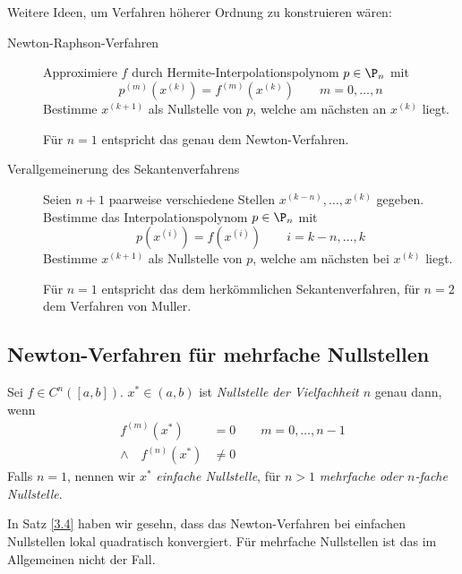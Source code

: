 \documentclass[11pt]{scrartcl}
\begin{document}
Weitere Ideen, um Verfahren höherer Ordnung zu konstruieren wären:
\begin{description}
	\item[Newton-Raphson-Verfahren]
		Approximiere $f$ durch Hermite-Interpolationspolynom $p\in \P_n$ mit 
		\[
			p^{(m)}(x^{(k)}) = f^{(m)}(x^{(k)}) \qquad m=0,\dotsc,n
		\]
		Bestimme $x^{(k+1)}$ als Nullstelle von $p$, welche am nächsten an $x^{(k)}$ liegt.

		Für $n=1$ entspricht das genau dem Newton-Verfahren.
	\item[Verallgemeinerung des Sekantenverfahrens]
		Seien $n+1$ paarweise verschiedene Stellen $x^{(k-n)}, \dotsc, x^{(k)}$ gegeben.
		Bestimme das Interpolationspolynom $p\in \P_n$ mit
		\[
			p(x^{(i)}) = f(x^{(i)}) \qquad i=k-n,\dotsc,k
		\]
		Bestimme $x^{(k+1)}$ als Nullstelle von $p$, welche am nächsten bei $x^{(k)}$ liegt.

		Für $n=1$ entspricht das dem herkömmlichen Sekantenverfahren, für $n=2$ dem Verfahren von Muller.
\end{description}


\subsection{Newton-Verfahren für mehrfache Nullstellen}

\begin{df} \label{3.14}
	Sei $f\in C^n ([a,b])$.
	$x^* \in (a,b)$ ist \emph{Nullstelle der Vielfachheit $n$} genau dann, wenn
	\begin{align*}
		f^{(m)}(x^*) &= 0 \qquad m=0,\dotsc,n-1 \\
		\land\quad f^{(n)}(x^*) &\neq 0
	\end{align*}
	Falls $n=1$, nennen wir $x^*$ \emph{einfache Nullstelle}, für $n>1$ \emph{mehrfache oder $n$-fache Nullstelle}.
\end{df}

\begin{nt*}
	In Satz \ref{3.4} haben wir gesehn, dass das Newton-Verfahren bei einfachen Nullstellen lokal quadratisch konvergiert.
	Für mehrfache Nullstellen ist das im Allgemeinen nicht der Fall.
\end{nt*}
\end{document}
